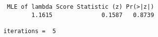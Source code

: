 \begin{verbatim} MLE of lambda Score Statistic (z) Pr(>|z|)
        1.1615              0.1587   0.8739

iterations =  5 
\end{verbatim}